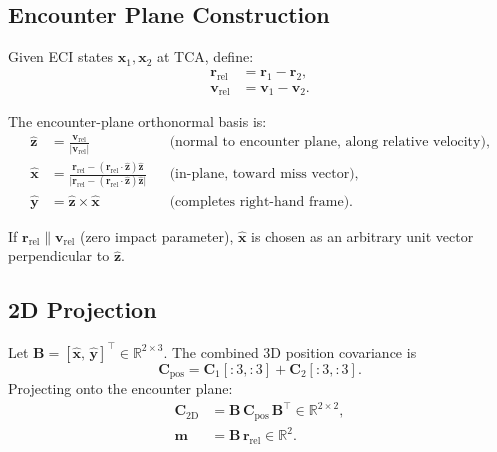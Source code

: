 \documentclass[11pt]{article}
\begin{document}
\subsection{Encounter Plane Construction}

Given ECI states $\mathbf{x}_1, \mathbf{x}_2$ at TCA, define:
\begin{align}
  \mathbf{r}_\text{rel} &= \mathbf{r}_1 - \mathbf{r}_2, \\
  \mathbf{v}_\text{rel} &= \mathbf{v}_1 - \mathbf{v}_2.
\end{align}

The encounter-plane orthonormal basis is:
\begin{align}
  \hat{\mathbf{z}} &= \frac{\mathbf{v}_\text{rel}}{|\mathbf{v}_\text{rel}|}
    && \text{(normal to encounter plane, along relative velocity)}, \\
  \hat{\mathbf{x}} &= \frac{\mathbf{r}_\text{rel} -
      (\mathbf{r}_\text{rel} \cdot \hat{\mathbf{z}})\hat{\mathbf{z}}}
    {\bigl|\mathbf{r}_\text{rel} - (\mathbf{r}_\text{rel} \cdot \hat{\mathbf{z}})\hat{\mathbf{z}}\bigr|}
    && \text{(in-plane, toward miss vector)}, \\
  \hat{\mathbf{y}} &= \hat{\mathbf{z}} \times \hat{\mathbf{x}}
    && \text{(completes right-hand frame)}.
\end{align}

If $\mathbf{r}_\text{rel} \parallel \mathbf{v}_\text{rel}$ (zero impact parameter),
$\hat{\mathbf{x}}$ is chosen as an arbitrary unit vector perpendicular to
$\hat{\mathbf{z}}$.

\subsection{2D Projection}

Let $\mathbf{B} = [\hat{\mathbf{x}},\, \hat{\mathbf{y}}]^\top \in \mathbb{R}^{2\times3}$.
The combined 3D position covariance is
\begin{equation}
  \mathbf{C}_\text{pos} = \mathbf{C}_1[{:}3,{:}3] + \mathbf{C}_2[{:}3,{:}3].
\end{equation}
Projecting onto the encounter plane:
\begin{align}
  \mathbf{C}_\text{2D} &= \mathbf{B}\,\mathbf{C}_\text{pos}\,\mathbf{B}^\top
    \in \mathbb{R}^{2\times2}, \label{eq:c2d}\\
  \mathbf{m} &= \mathbf{B}\,\mathbf{r}_\text{rel} \in \mathbb{R}^2.
    \label{eq:miss2d}
\end{align}
\end{document}
